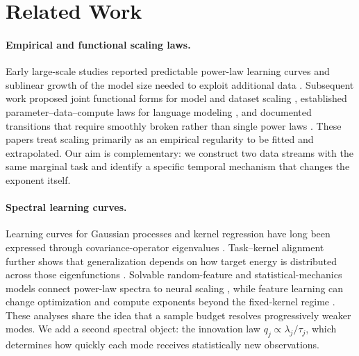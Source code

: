 \section{Related Work}

\paragraph{Empirical and functional scaling laws.}
Early large-scale studies reported predictable power-law learning curves and
sublinear growth of the model size needed to exploit additional data
\cite{hestness2017deep}.  Subsequent work proposed joint functional forms for
model and dataset scaling \cite{rosenfeld2020constructive}, established
parameter--data--compute laws for language modeling
\cite{kaplan2020scaling,hoffmann2022training}, and documented transitions that
require smoothly broken rather than single power laws
\cite{caballero2023broken}.  These papers treat scaling primarily as an
empirical regularity to be fitted and extrapolated.  Our aim is complementary:
we construct two data streams with the same marginal task and identify a
specific temporal mechanism that changes the exponent itself.

\paragraph{Spectral learning curves.}
Learning curves for Gaussian processes and kernel regression have long been
expressed through covariance-operator eigenvalues
\cite{sollich1998learning,bordelon2020spectrum}.  Task--kernel alignment further
shows that generalization depends on how target energy is distributed across
those eigenfunctions \cite{canatar2021spectral}.  Solvable random-feature and
statistical-mechanics models connect power-law spectra to neural scaling
\cite{maloney2022solvable,bahri2024explaining}, while feature learning can
change optimization and compute exponents beyond the fixed-kernel regime
\cite{bordelon2024feature}.  These analyses share the idea that a sample budget
resolves progressively weaker modes.  We add a second spectral object: the
innovation law $q_j\propto\lambda_j/\tau_j$, which determines how quickly each
mode receives statistically new observations.


